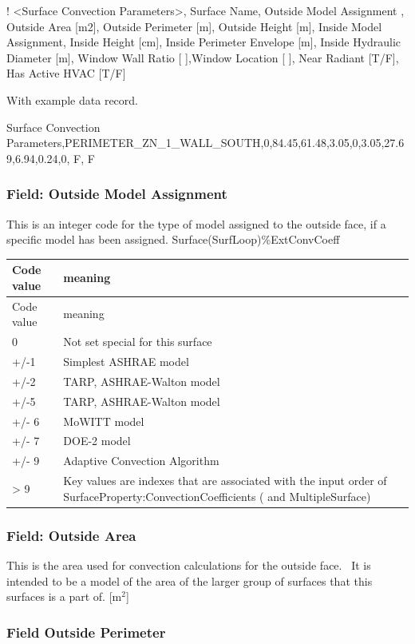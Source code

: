 ! \textless{}Surface Convection Parameters\textgreater{}, Surface Name, Outside Model Assignment , Outside Area {[}m2{]}, Outside Perimeter {[}m{]}, Outside Height {[}m{]}, Inside Model Assignment, Inside Height {[}cm{]}, Inside Perimeter Envelope {[}m{]}, Inside Hydraulic Diameter {[}m{]}, Window Wall Ratio {[} {]},Window Location {[} {]}, Near Radiant {[}T/F{]}, Has Active HVAC {[}T/F{]}

With example data record.

Surface Convection Parameters,PERIMETER\_ZN\_1\_WALL\_SOUTH,0,84.45,61.48,3.05,0,3.05,27.69,6.94,0.24,0, F, F

\subsubsection{Field: Outside Model Assignment}\label{field-outside-model-assignment}

This is an integer code for the type of model assigned to the outside face, if a specific model has been assigned. Surface(SurfLoop)\%ExtConvCoeff

\begin{longtable}[c]{p{1.5in}p{4.5in}}
\toprule
Code value & meaning \tabularnewline
\midrule
\endfirsthead

\toprule
Code value & meaning \tabularnewline
\midrule
\endhead

0 & Not set special for this surface \tabularnewline
+/-1 & Simplest ASHRAE model \tabularnewline
+/-2 & TARP, ASHRAE-Walton model \tabularnewline
+/-5 & TARP, ASHRAE-Walton model \tabularnewline
+/- 6 & MoWITT model \tabularnewline
+/- 7 & DOE-2 model \tabularnewline
+/- 9 & Adaptive Convection Algorithm \tabularnewline
> 9 & Key values are indexes that are associated with the input order of SurfaceProperty:ConvectionCoefficients ( and MultipleSurface) \tabularnewline
\bottomrule
\end{longtable}

\subsubsection{Field: Outside Area}\label{field-outside-area}

This is the area used for convection calculations for the outside face.~ It is intended to be a model of the area of the larger group of surfaces that this surfaces is a part of. {[}m\(^{2}\){]}

\subsubsection{Field Outside Perimeter}\label{field-outside-perimeter}


